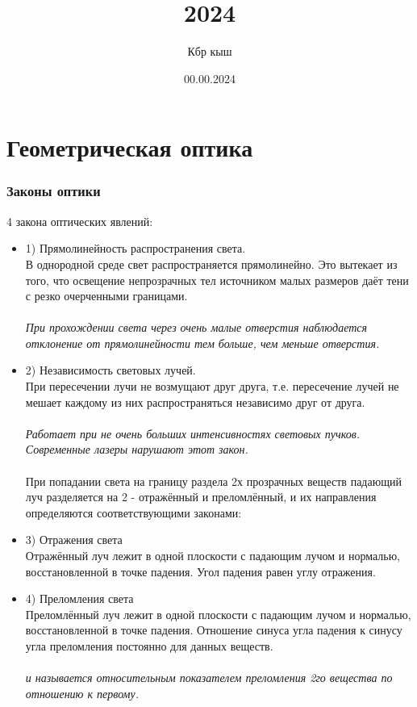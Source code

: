 \documentclass[14pt]{extarticle}
\title{2024}
\author{Кбр кыш}
\date{00.00.2024}
\begin{document}
\maketitle
\tableofcontents

\part{Геометрическая оптика}
\section{Законы оптики}
4 закона оптических явлений: 
\begin{itemize}
    \item 1) Прямолинейность распространения света.\\
    В однородной среде свет распространяется прямолинейно. 
    Это вытекает из того, что освещение непрозрачных тел 
    источником малых размеров даёт тени с резко очерченными границами.\\\\
    \textsl{При прохождении света через очень малые отверстия наблюдается
    отклонение от прямолинейности тем больше, чем меньше отверстия.} 
    \item 2) Независимость световых лучей.\\
    При пересечении лучи не возмущают друг друга, т.е. пересечение лучей
    не мешает каждому из них распространяться независимо друг от друга.\\\\
    \textsl{Работает при не очень больших интенсивностях световых пучков.
    Современные лазеры нарушают этот закон.}\\
    \\
    При попадании света на границу раздела 2х прозрачных веществ падающий луч
разделяется на 2 - отражённый и преломлённый, и их направления определяются
соответствующими законами:
    \item 3) Отражения света\\
    Отражённый луч лежит в одной плоскости с падающим лучом и нормалью,
    восстановленной в точке падения. 
    Угол падения равен углу отражения. 
    \item 4) Преломления света\\
    Преломлённый луч лежит в одной плоскости с падающим лучом и нормалью,
    восстановленной в точке падения. Отношение синуса угла падения к синусу 
    угла преломления постоянно для данных веществ.\\\\
    \textsl{и называется относительным показателем 
    преломления 2го вещества по отношению к первому.}
\end{itemize} \
\end{document}
